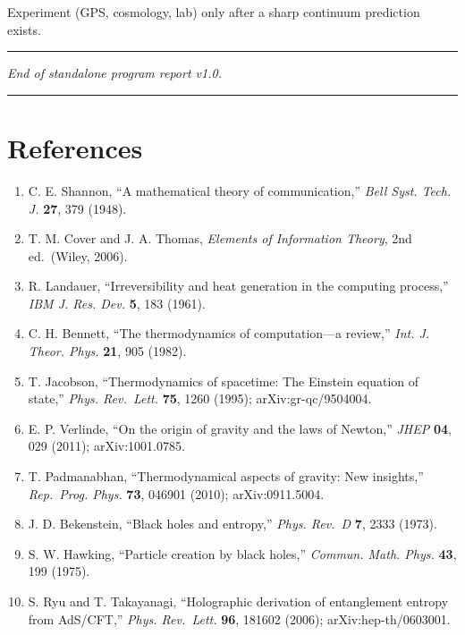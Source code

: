 \documentclass[
  11pt,
]{article}
\providecommand{\tightlist}{%
  \setlength{\itemsep}{0pt}\setlength{\parskip}{0pt}}
\begin{document}
Experiment (GPS, cosmology, lab) only after a sharp continuum prediction
exists.

\begin{center}\rule{0.5\linewidth}{0.5pt}\end{center}

\emph{End of standalone program report v1.0.}

\begin{center}\rule{0.5\linewidth}{0.5pt}\end{center}

\section{References}\label{references}

\begin{enumerate}
\def\labelenumi{\arabic{enumi}.}
\tightlist
\item
  C. E. Shannon, ``A mathematical theory of communication,'' \emph{Bell
  Syst. Tech. J.} \textbf{27}, 379 (1948).
\item
  T. M. Cover and J. A. Thomas, \emph{Elements of Information Theory},
  2nd ed.~(Wiley, 2006).
\item
  R. Landauer, ``Irreversibility and heat generation in the computing
  process,'' \emph{IBM J. Res. Dev.} \textbf{5}, 183 (1961).
\item
  C. H. Bennett, ``The thermodynamics of computation---a review,''
  \emph{Int. J. Theor. Phys.} \textbf{21}, 905 (1982).
\item
  T. Jacobson, ``Thermodynamics of spacetime: The Einstein equation of
  state,'' \emph{Phys. Rev.~Lett.} \textbf{75}, 1260 (1995);
  arXiv:gr-qc/9504004.
\item
  E. P. Verlinde, ``On the origin of gravity and the laws of Newton,''
  \emph{JHEP} \textbf{04}, 029 (2011); arXiv:1001.0785.
\item
  T. Padmanabhan, ``Thermodynamical aspects of gravity: New insights,''
  \emph{Rep.~Prog. Phys.} \textbf{73}, 046901 (2010); arXiv:0911.5004.
\item
  J. D. Bekenstein, ``Black holes and entropy,'' \emph{Phys. Rev.~D}
  \textbf{7}, 2333 (1973).
\item
  S. W. Hawking, ``Particle creation by black holes,'' \emph{Commun.
  Math. Phys.} \textbf{43}, 199 (1975).
\item
  S. Ryu and T. Takayanagi, ``Holographic derivation of entanglement
  entropy from AdS/CFT,'' \emph{Phys. Rev.~Lett.} \textbf{96}, 181602
  (2006); arXiv:hep-th/0603001.

\end{enumerate}
\end{document}
